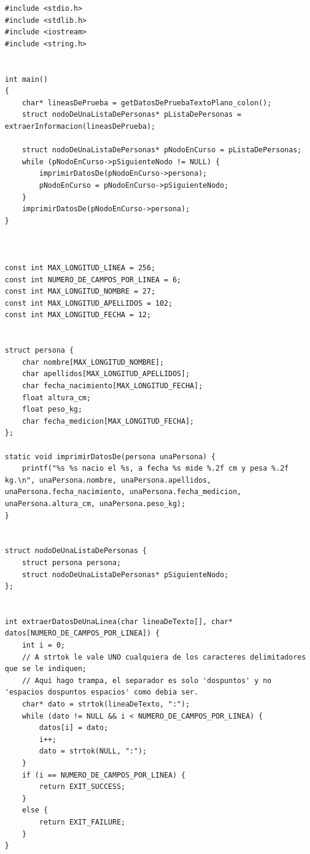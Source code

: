\documentclass[spanish,12pt,a4paper,final,oneside]{book}
\begin{document}
\begin{lstlisting}[frame=single, caption=lenguaje c]
#include <stdio.h>
#include <stdlib.h>
#include <iostream>
#include <string.h>


int main()
{
	char* lineasDePrueba = getDatosDePruebaTextoPlano_colon();
    struct nodoDeUnaListaDePersonas* pListaDePersonas = extraerInformacion(lineasDePrueba);

    struct nodoDeUnaListaDePersonas* pNodoEnCurso = pListaDePersonas;
    while (pNodoEnCurso->pSiguienteNodo != NULL) {
        imprimirDatosDe(pNodoEnCurso->persona);
        pNodoEnCurso = pNodoEnCurso->pSiguienteNodo;
    }
    imprimirDatosDe(pNodoEnCurso->persona);
}



const int MAX_LONGITUD_LINEA = 256;
const int NUMERO_DE_CAMPOS_POR_LINEA = 6;
const int MAX_LONGITUD_NOMBRE = 27;
const int MAX_LONGITUD_APELLIDOS = 102; 
const int MAX_LONGITUD_FECHA = 12;


struct persona {
    char nombre[MAX_LONGITUD_NOMBRE];
    char apellidos[MAX_LONGITUD_APELLIDOS];
    char fecha_nacimiento[MAX_LONGITUD_FECHA];
    float altura_cm;
    float peso_kg;
    char fecha_medicion[MAX_LONGITUD_FECHA];
};

static void imprimirDatosDe(persona unaPersona) {
    printf("%s %s nacio el %s, a fecha %s mide %.2f cm y pesa %.2f kg.\n", unaPersona.nombre, unaPersona.apellidos, unaPersona.fecha_nacimiento, unaPersona.fecha_medicion, unaPersona.altura_cm, unaPersona.peso_kg);
}


struct nodoDeUnaListaDePersonas {
    struct persona persona;
    struct nodoDeUnaListaDePersonas* pSiguienteNodo;
};


int extraerDatosDeUnaLinea(char lineaDeTexto[], char* datos[NUMERO_DE_CAMPOS_POR_LINEA]) {
    int i = 0;
    // A strtok le vale UNO cualquiera de los caracteres delimitadores que se le indiquen;
    // Aqui hago trampa, el separador es solo 'dospuntos' y no 'espacios dospuntos espacios' como debia ser.
    char* dato = strtok(lineaDeTexto, ":"); 
    while (dato != NULL && i < NUMERO_DE_CAMPOS_POR_LINEA) {
        datos[i] = dato;
        i++;
        dato = strtok(NULL, ":");
    }
    if (i == NUMERO_DE_CAMPOS_POR_LINEA) {
        return EXIT_SUCCESS;
    }
    else {
        return EXIT_FAILURE;
    }
}



\end{lstlisting}
\end{document}

